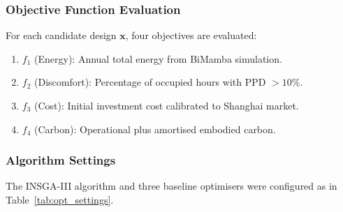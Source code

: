 \documentclass[11pt]{article}
\begin{document}
\subsubsection{Objective Function Evaluation}

For each candidate design $\mathbf{x}$, four objectives are evaluated:

\begin{enumerate}[leftmargin=*]
\item $f_1$ (Energy): Annual total energy from BiMamba simulation.
\item $f_2$ (Discomfort): Percentage of occupied hours with PPD $>10\%$.
\item $f_3$ (Cost): Initial investment cost calibrated to Shanghai market.
\item $f_4$ (Carbon): Operational plus amortised embodied carbon.
\end{enumerate}

\subsubsection{Algorithm Settings}

The INSGA-III algorithm and three baseline optimisers were configured as in Table~\ref{tab:opt_settings}.

\begin{table}[!htbp]
\centering
\caption{Optimisation algorithm settings}
\label{tab:opt_settings}
\end{table}
\end{document}
